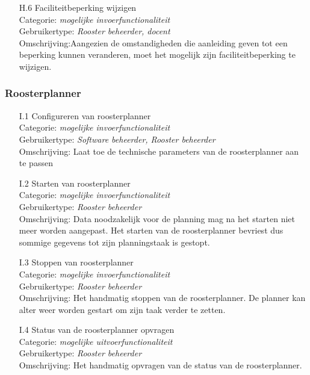 \documentclass{article}
\begin{document}
\begin{itemize}
\item[H.6] Faciliteitbeperking wijzigen \\
Categorie: \textit{mogelijke invoerfunctionaliteit} \\
Gebruikertype: \textit{Rooster beheerder, docent} \\
Omschrijving:Aangezien de omstandigheden die aanleiding geven tot een beperking kunnen veranderen, moet het mogelijk zijn faciliteitbeperking te wijzigen. \\[-3mm]
\end{itemize}

\subsubsection{Roosterplanner}

\begin{itemize}
\item[I.1] Configureren van roosterplanner \\
Categorie: \textit{mogelijke invoerfunctionaliteit} \\
Gebruikertype: \textit{Software beheerder, Rooster beheerder} \\
Omschrijving: Laat toe de technische parameters van de roosterplanner aan te passen \\[-3mm]

\item[I.2] Starten van roosterplanner \\
Categorie: \textit{mogelijke invoerfunctionaliteit} \\
Gebruikertype: \textit{Rooster beheerder} \\
Omschrijving: Data noodzakelijk voor de planning mag na het starten niet meer worden aangepast. Het starten van de roosterplanner bevriest dus sommige gegevens tot zijn planningstaak is gestopt. \\[-3mm]

\item[I.3] Stoppen van roosterplanner \\
Categorie: \textit{mogelijke invoerfunctionaliteit} \\
Gebruikertype: \textit{Rooster beheerder} \\
Omschrijving: Het handmatig stoppen van de roosterplanner. De planner kan alter weer worden gestart om zijn taak verder te zetten. \\[-3mm]

\item[I.4] Status van de roosterplanner opvragen \\
Categorie: \textit{mogelijke uitvoerfunctionaliteit} \\
Gebruikertype: \textit{Rooster beheerder} \\
Omschrijving: Het handmatig opvragen van de status van de roosterplanner. \\[-3mm]


\end{itemize}
\end{document}
